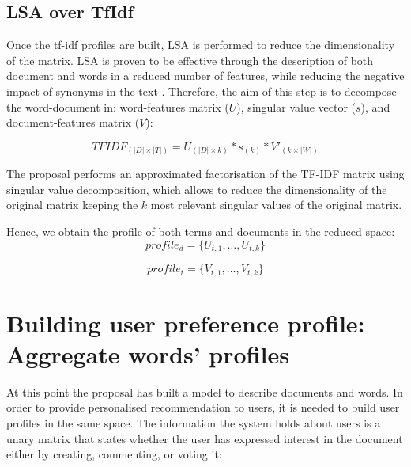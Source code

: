 \documentclass[preprint]{elsarticle}
\begin{document}
\begin{spacing}{2}
\subsection{LSA over TfIdf}

Once the tf-idf profiles are built, LSA is performed to reduce the dimensionality of the matrix. LSA is proven to be effective through the description of both document and words in a reduced number of features, while reducing the negative impact of synonyms in the text \cite{}. Therefore, the aim of this step is to decompose the word-document in: word-features matrix ($U$), singular value vector ($s$), and document-features matrix ($V$):

\begin{equation}
	TFIDF_{(|D|\times|T|)} = U_{(|D|\times k)} * s_{(k)} * V'_{(k \times |W|)}
\end{equation}

The proposal performs an approximated factorisation of the TF-IDF matrix using singular value decomposition, which allows to reduce the dimensionality of the original matrix keeping the $k$ most relevant singular values of the original matrix.

Hence, we obtain the profile of both terms and documents in the reduced space:
\begin{equation}
	profile_d = \{ U_{t,1},\dots, U_{t,k}\}
\end{equation}

\begin{equation}
	profile_t = \{ V_{t,1},\dots, V_{t,k}\}
\end{equation}

\section{Building user preference profile: Aggregate words' profiles}

At this point the proposal has built a model to describe documents and words. In order to provide personalised recommendation to users, it is needed to build user profiles in the same space. The information the system holds about users is a unary matrix that states whether the user has expressed interest in the document either by creating, commenting, or voting it:


\end{spacing}
\end{document}
